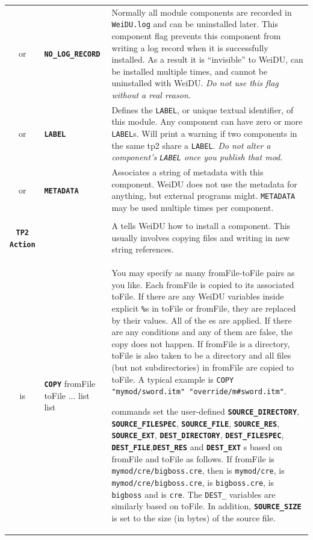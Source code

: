 \documentclass{article}
\def\ttref#1{\ahrefloc{#1}{\tt #1}}
\def\DEFINE#1{{\tt \bf #1}\label{#1}\index{#1}}
\def\t#1{{\tt #1}}
\def\Slist{{\color{red} list }}
\begin{document}
\begin{tabular}{cp{10in}|p{10in}}
  or & \DEFINE{NO_LOG_RECORD} &
      Normally all module components are recorded in \t{WeiDU.log} and can
      be uninstalled later. This component flag prevents this component
      from writing a log record when it is successfully installed. As a
      result it is ``invisible'' to WeiDU, can be installed multiple times,
      and cannot be uninstalled with WeiDU. \emph{Do not use this flag without
	  a real reason.} \\
  or & \DEFINE{LABEL} \ttref{String} &
      Defines the \t{LABEL}, or unique textual identifier, of this
      module. Any component can have zero or more \t{LABEL}s. Will
      print a warning if two components in the same tp2 share a
      \t{LABEL}. \emph{Do not alter a component's \t{LABEL} once you
        publish that mod}. \\

  or & \DEFINE{METADATA} \ttref{String} &
      Associates a string of metadata with this component. WeiDU does
      not use the metadata for anything, but external programs might.
      \t{METADATA} may be used multiple times per component.\\ \\

\DEFINE{TP2 Action} & &
  A \ttref{TP2 Action} tells WeiDU how to install a component. This usually
  involves copying files and writing in new string references. \\

  is & \DEFINE{COPY} \ttref{optNoBackup}
                     \ttref{optGlob} fromFile toFile ...
       \ttref{patch} \Slist
       \ttref{when} \Slist &

       You may specify as many fromFile-toFile pairs as you like. Each
       fromFile is copied to its associated toFile. If there are any
       WeiDU variables inside explicit \t{\%}s in toFile or fromFile,
       they are replaced by their values. All of the \ttref{patch}es
       are applied. If there are any \ttref{when} conditions and any
       of them are false, the copy does not happen. If fromFile is a
       directory, toFile is also taken to be a directory and all files
       (but not subdirectories) in fromFile are copied to toFile.  A
       typical example is \t{COPY "mymod/sword.itm"
         "override/m\#sword.itm"}.


       \ttref{COPY} commands set the user-defined \DEFINE{SOURCE_DIRECTORY},
       \DEFINE{SOURCE_FILESPEC}, \DEFINE{SOURCE_FILE},
       \DEFINE{SOURCE_RES}, \DEFINE{SOURCE_EXT},
       \DEFINE{DEST_DIRECTORY}, \DEFINE{DEST_FILESPEC},
       \DEFINE{DEST_FILE},\DEFINE{DEST_RES} and \DEFINE{DEST_EXT}
       \ttref{variable}s based on fromFile and toFile as follows. If
       fromFile is \t{mymod/cre/bigboss.cre}, then
       \ttref{SOURCE_DIRECTORY} is \t{mymod/cre},
       \ttref{SOURCE_FILESPEC} is \t{mymod/cre/bigboss.cre},
       \ttref{SOURCE_FILE} is \t{bigboss.cre},
       \ttref{SOURCE_RES} is \t{bigboss} and \ttref{SOURCE_EXT} is \t{cre}.
       The \t{DEST_} variables
       are similarly based on toFile. In addition, \DEFINE{SOURCE_SIZE} is
       set to the size (in bytes) of the source file.



\end{tabular}
\end{document}
